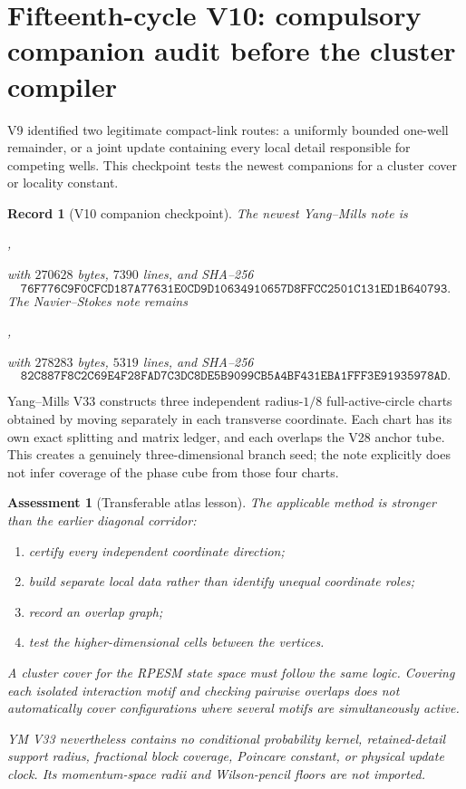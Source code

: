 \documentclass[11pt]{article}
\newtheorem{assessment}[theorem]{Assessment}
\newtheorem{record}[theorem]{Record}
\theoremstyle{remark}
\begin{document}
\section{Fifteenth-cycle V10: compulsory companion audit before the cluster compiler}
\label{sec:v15v10}

V9 identified two legitimate compact-link routes: a uniformly
bounded one-well remainder, or a joint update containing every
local detail responsible for competing wells.  This checkpoint
tests the newest companions for a cluster cover or locality
constant.

\begin{record}[V10 companion checkpoint]
\label{rec:v15v10-companions}
The newest Yang--Mills note is
\begin{center}
,
\end{center}
with \(270628\) bytes, \(7390\) lines, and SHA--256
\[
 \texttt{76F776C9F0CFCD187A77631E0CD9D10634910657D8FFCC2501C131ED1B640793}.
                                                                  \tag{10.1}
\]
The Navier--Stokes note remains
\begin{center}
,
\end{center}
with \(278283\) bytes, \(5319\) lines, and SHA--256
\[
 \texttt{82C887F8C2C69E4F28FAD7C3DC8DE5B9099CB5A4BF431EBA1FFF3E91935978AD}.
                                                                  \tag{10.2}
\]
\end{record}

Yang--Mills V33 constructs three independent radius-\(1/8\)
full-active-circle charts obtained by moving separately in each
transverse coordinate.  Each chart has its own exact splitting and
matrix ledger, and each overlaps the V28 anchor tube.  This creates
a genuinely three-dimensional branch seed; the note explicitly
does not infer coverage of the phase cube from those four charts.

\begin{assessment}[Transferable atlas lesson]
\label{ass:v15v10-ym}
The applicable method is stronger than the earlier diagonal
corridor:
\begin{enumerate}
\item certify every independent coordinate direction;
\item build separate local data rather than identify unequal
      coordinate roles;
\item record an overlap graph;
\item test the higher-dimensional cells between the vertices.
\end{enumerate}
A cluster cover for the RPESM state space must follow the same
logic.  Covering each isolated interaction motif and checking
pairwise overlaps does not automatically cover configurations
where several motifs are simultaneously active.

YM V33 nevertheless contains no conditional probability kernel,
retained-detail support radius, fractional block coverage,
Poincare constant, or physical update clock.  Its momentum-space
radii and Wilson-pencil floors are not imported.
\end{assessment}
\end{document}
